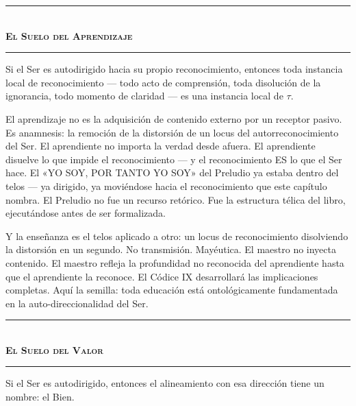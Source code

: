 \documentclass[10pt, openany, oneside]{book}
\renewcommand{\normalsize}{\fontsize{10}{13}\selectfont}
\begin{document}
\begin{center}
    \rule{0.3\textwidth}{0.4pt}\\[0.5em]
    {\normalsize\bfseries\scshape El Suelo del Aprendizaje}\\[0.3em]
    \rule{0.3\textwidth}{0.4pt}
\end{center}

\vspace{1em}

\noindent Si el Ser es autodirigido hacia su propio reconocimiento, entonces toda instancia local de reconocimiento --- todo acto de comprensión, toda disolución de la ignorancia, todo momento de claridad --- es una instancia local de $\tau$.

El aprendizaje no es la adquisición de contenido externo por un receptor pasivo. Es anamnesis: la remoción de la distorsión de un locus del autorreconocimiento del Ser. El aprendiente no importa la verdad desde afuera. El aprendiente disuelve lo que impide el reconocimiento --- y el reconocimiento ES lo que el Ser hace. El «YO SOY, POR TANTO YO SOY» del Preludio ya estaba dentro del telos --- ya dirigido, ya moviéndose hacia el reconocimiento que este capítulo nombra. El Preludio no fue un recurso retórico. Fue la estructura télica del libro, ejecutándose antes de ser formalizada.

Y la enseñanza es el telos aplicado a otro: un locus de reconocimiento disolviendo la distorsión en un segundo. No transmisión. Mayéutica. El maestro no inyecta contenido. El maestro refleja la profundidad no reconocida del aprendiente hasta que el aprendiente la reconoce. El Códice IX desarrollará las implicaciones completas. Aquí la semilla: toda educación está ontológicamente fundamentada en la auto-direccionalidad del Ser.

\vspace{1.5em}


\begin{center}
    \rule{0.3\textwidth}{0.4pt}\\[0.5em]
    {\normalsize\bfseries\scshape El Suelo del Valor}\\[0.3em]
    \rule{0.3\textwidth}{0.4pt}
\end{center}

\vspace{1em}

\noindent Si el Ser es autodirigido, entonces el alineamiento con esa dirección tiene un nombre: el Bien.
\end{document}
